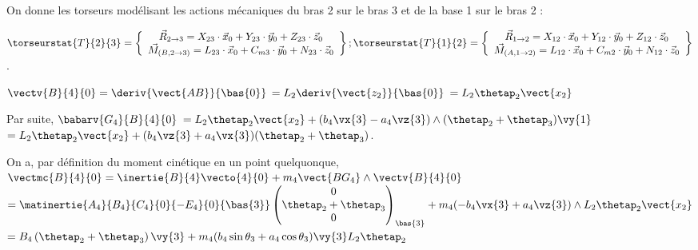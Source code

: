 \ifprof
\else

On donne les torseurs modélisant les actions mécaniques du bras 2 sur le bras 3 et de la base 1 sur le bras 2 :

$\torseurstat{T}{2}{3}=\left\{\begin{array}{c}\vec{R}_{2 \rightarrow 3}=X_{23} \cdot \vec{x}_{0}+Y_{23} \cdot \vec{y}_{0}+Z_{23} \cdot \vec{z}_{0} \\ \vec{M}_{(B, 2 \rightarrow 3)}=L_{23} \cdot \vec{x}_{0}+C_{m 3} \cdot \vec{y}_{0}+N_{23} \cdot \vec{z}_{0}\end{array}\right\} ; \torseurstat{T}{1}{2}=\left\{\begin{array}{c}\vec{R}_{1 \rightarrow 2}=X_{12} \cdot \vec{x}_{0}+Y_{12} \cdot \vec{y}_{0}+Z_{12} \cdot \vec{z}_{0} \\ \vec{M}_{(A, 1 \rightarrow 2)}=L_{12} \cdot \vec{x}_{0}+C_{m 2} \cdot \vec{y}_{0}+N_{12} \cdot \vec{z}_{0}\end{array}\right\}$.
\fi





\ifprof
\begin{corrige}
$\vectv{B}{4}{0} = \deriv{\vect{AB}}{\bas{0}}$
$=L_2\deriv{\vect{z_2}}{\bas{0}}$
$=L_2\thetap_2 \vect{x_2}$

Par suite, 
$\babarv{G_4}{B}{4}{0}$
$=L_2\thetap_2 \vect{x_2} + (b_4\vx{3}-a_4 \vz{3})\wedge (\thetap_2+\thetap_3)\vy{1}$
$=L_2\thetap_2 \vect{x_2} + (b_4\vz{3}+a_4 \vx{3}) (\thetap_2+\thetap_3)$.

\end{corrige}
\else
\fi

\ifprof
\begin{corrige}
On a, par définition du moment cinétique en un point quelquonque, 
$\vectmc{B}{4}{0} = \inertie{B}{4} \vecto{4}{0} + m_4 \vect{BG_4}\wedge\vectv{B}{4}{0}$
$=\matinertie{A_4}{B_4}{C_4}{0}{-E_4}{0}{\bas{3}} \begin{pmatrix} 0 \\ \thetap_2+\thetap_3\\  0\end{pmatrix}_{\bas{3}}
+  m_4 (-b_4\vx{3}+a_4 \vz{3})\wedge  L_2\thetap_2 \vect{x_2} $
$=B_4 \left(\thetap_2+\thetap_3\right) \vy{3}+  m_4 ( b_4\sin\theta_3 +a_4 \cos\theta_3 )\vy{3} L_2\thetap_2  $
\end{corrige}
\else
\fi


